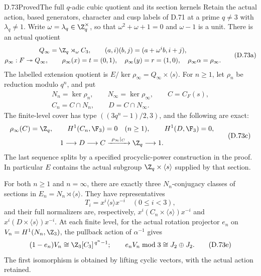 \begin{claim}{D.73}{Proved}{The full \(q\)-adic cubic quotient and its section kernels}
Retain the actual action, based generators, character and cusp labels
of D.71 at a prime \(q\ne3\) with \(\lambda_q\ne1\).
Write \(\omega=\lambda_q\in\Z_q^\times\), so that
\(\omega^2+\omega+1=0\) and \(\omega-1\) is a unit.
There is an actual quotient
\[
 \begin{gathered}
 Q_\infty=\Z_q\rtimes_\omega C_3,\qquad
 (a,i)(b,j)=(a+\omega^i b,i+j),\\
 \rho_\infty:F\twoheadrightarrow Q_\infty,\qquad
 \rho_\infty(x)=t=(0,1),\quad
 \rho_\infty(y)=r=(1,0),\quad
 \rho_\infty\alpha=\rho_\infty .
 \end{gathered}                                                 \tag{D.73a}
\]
The labelled extension quotient is
\(E/\ker\rho_\infty=Q_\infty\times\langle s\rangle\).
For \(n\geq1\), let \(\rho_n\) be reduction modulo \(q^n\),
and put
\[
 \begin{gathered}
 N_n=\ker\rho_n,\qquad N_\infty=\ker\rho_\infty,\qquad
 C=C_F(s),\\
 C_n=C\cap N_n,\qquad D=C\cap N_\infty .
 \end{gathered}                                                 \tag{D.73b}
\]
The finite-level cover has type
\(((3q^n-1)/2,3)\), and the following are exact:
\[
 \begin{gathered}
 \rho_\infty(C)=\Z_q,\qquad
 H^1(C_n,\F_3)=0\quad(n\geq1),\qquad H^1(D,\F_3)=0,\\
 1\longrightarrow D\longrightarrow C
       \xrightarrow{\ \rho_\infty|_C\ }\Z_q\longrightarrow1 .
 \end{gathered}                                                 \tag{D.73c}
\]
The last sequence splits by a specified procyclic-power construction
in the proof. In particular \(E\) contains the actual subgroup
\(\Z_q\times\langle s\rangle\) supplied by that section.

For both \(n\geq1\) and \(n=\infty\), there are exactly three
\(N_n\)-conjugacy classes of sections in
\(E_n=N_n\rtimes\langle s\rangle\). They have representatives
\[
 T_i=x^i\langle s\rangle x^{-i}\quad(0\leq i<3),
                                                               \tag{D.73d}
\]
and their full normalizers are, respectively,
\(x^i(C_n\times\langle s\rangle)x^{-i}\) and
\(x^i(D\times\langle s\rangle)x^{-i}\).
At each finite level, for the actual rotation projector \(e_n\)
on \(V_n=H^1(N_n,\Z_3)\), the pullback action of
\(\alpha^{-1}\) gives
\[
 (1-e_n)V_n\cong\Z_3[C_3]^{\,q^n-1};
 \qquad e_nV_n\bmod3\cong J_2\oplus J_2 .
                                                               \tag{D.73e}
\]
The first isomorphism is obtained by lifting cyclic vectors,
with the actual action retained.


\end{claim}
